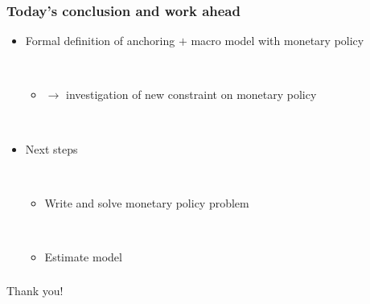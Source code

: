 \documentclass{beamer}
\begin{document}
\begin{frame}
	\frametitle{Today's conclusion and work ahead}
\vspace{-1cm}
	
\begin{itemize}
\item Formal definition of anchoring $+$ macro model with monetary policy

\

\begin{itemize}
\item[] $\rightarrow$ investigation of new constraint on monetary policy
\end{itemize}

\

\item Next steps

\

\begin{itemize}
\item Write and solve monetary policy problem

\

\item Estimate model
\end{itemize}

\end{itemize}


\end{frame}

\begin{frame}
	\frametitle{}
\vspace{-1cm}
	
\centering Thank you!


\end{frame}


%

%	
%



\appendix
\end{document}
